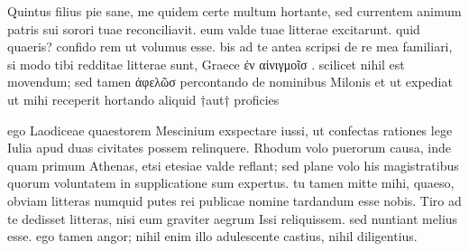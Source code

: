 


 Quintus filius pie sane, me quidem certe multum hortante, sed currentem animum patris sui sorori tuae reconciliavit. eum valde tuae litterae excitarunt. quid quaeris? confido rem ut volumus esse. bis ad te antea scripsi de re mea familiari, si modo tibi redditae litterae sunt, Graece ἐν αἰνιγμοῖσ . scilicet nihil est movendum; sed tamen ἀφελῶσ percontando de nominibus Milonis et ut expediat ut mihi receperit hortando aliquid †aut† proficies

 ego Laodiceae quaestorem Mescinium exspectare iussi, ut confectas rationes lege Iulia apud duas civitates possem relinquere. Rhodum volo puerorum causa, inde quam primum Athenas, etsi etesiae valde reflant; sed plane volo his magistratibus quorum voluntatem in supplicatione sum expertus. tu tamen mitte mihi, quaeso, obviam litteras numquid putes rei publicae nomine tardandum esse nobis. Tiro ad te dedisset litteras, nisi eum graviter aegrum Issi reliquissem. sed nuntiant melius esse. ego tamen angor; nihil enim illo adulescente castius, nihil diligentius.
